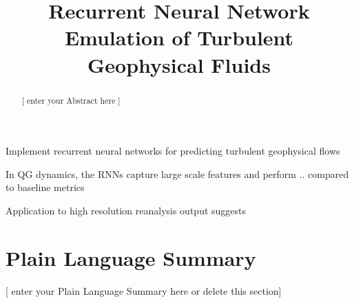 \documentclass[draft]{agujournal2019}
\begin{document}
\title{Recurrent Neural Network Emulation of Turbulent Geophysical Fluids}

%
%






\begin{keypoints}
    \item Implement recurrent neural networks for predicting turbulent geophysical flows
    \item In QG dynamics, the RNNs capture large scale features and perform .. compared to baseline metrics
    \item Application to high resolution reanalysis output suggests
\end{keypoints}

%
%

\begin{abstract}
[ enter your Abstract here ]
\end{abstract}

\section*{Plain Language Summary}
[ enter your Plain Language Summary here or delete this section]


%
%
\end{document}
